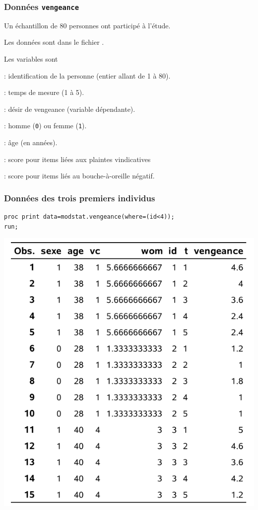 \documentclass{beamer}
\begin{document}
\begin{frame}
\frametitle{Données \texttt{vengeance}}
\bi
\item Un échantillon de 80 personnes ont participé à l'étude. 
\item Les données sont dans le fichier . 
\item Les variables sont 
\bi

\item {}: identification de la personne (entier allant de 1 à 80).
\item {}: temps de mesure (1 à 5).
\item {}: désir de vengeance (variable dépendante).
\item {}: homme (\texttt{0}) ou femme (\texttt{1}).
\item {}: âge (en années).
\item {}: score pour items liées aux plaintes vindicatives
\item {}: score pour items liés au bouche-à-oreille négatif.
\ei
\ei
\end{frame}

\begin{frame}[fragile]
\frametitle{Données des trois premiers individus}
\begin{tcolorbox}[colback=white, colframe=hecblue, title=Code \SASlang{} pour imprimer un sous-ensemble des données]
\begin{verbatim}
proc print data=modstat.vengeance(where=(id<4)); 
run;
\end{verbatim}
\end{tcolorbox}
\begin{center}
\includegraphics[width = 0.5\linewidth]{img/c5/diapos6-e01}
\end{center}

\end{frame}
\end{document}
